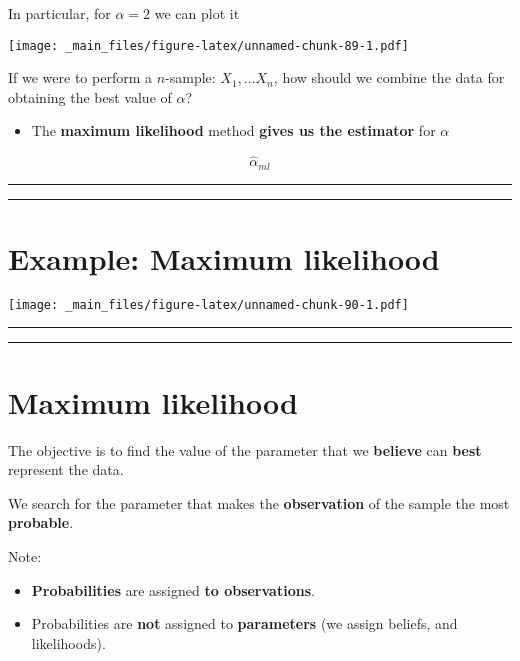 \documentclass[
]{book}
\providecommand{\tightlist}{%
  \setlength{\itemsep}{0pt}\setlength{\parskip}{0pt}}
\begin{document}
In particular, for \(\alpha=2\) we can plot it

\texttt{[image: \_main\_files/figure-latex/unnamed-chunk-89-1.pdf]}

If we were to perform a \(n\)-sample: \(X_1,...X_n\), how should we combine the data for obtaining the best value of \(\alpha\)?

\begin{itemize}
\tightlist
\item
  The \textbf{maximum likelihood} method \textbf{gives us the estimator} for \(\alpha\)
\end{itemize}

\[\hat{\alpha}_{ml}\]

\begin{center}\rule{0.5\linewidth}{0.5pt}\end{center}

\begin{center}\rule{0.5\linewidth}{0.5pt}\end{center}

\hypertarget{example-maximum-likelihood}{%
\section{Example: Maximum likelihood}\label{example-maximum-likelihood}}

\texttt{[image: \_main\_files/figure-latex/unnamed-chunk-90-1.pdf]}

\begin{center}\rule{0.5\linewidth}{0.5pt}\end{center}

\begin{center}\rule{0.5\linewidth}{0.5pt}\end{center}

\hypertarget{maximum-likelihood-2}{%
\section{Maximum likelihood}\label{maximum-likelihood-2}}

The objective is to find the value of the parameter that we \textbf{believe} can \textbf{best} represent the data.

We search for the parameter that makes the \textbf{observation} of the sample the most \textbf{probable}.

Note:

\begin{itemize}
\tightlist
\item
  \textbf{Probabilities} are assigned \textbf{to observations}.
\item
  Probabilities are \textbf{not} assigned to \textbf{parameters} (we assign beliefs, and likelihoods).
\end{itemize}
\end{document}
